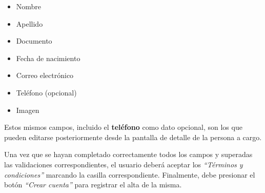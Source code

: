 \documentclass[a4paper,12pt]{article}
\begin{document}
    \begin{itemize}
        \item Nombre
        \item Apellido
        \item Documento
        \item Fecha de nacimiento
        \item Correo electrónico
        \item Teléfono (opcional)
        \item Imagen
    \end{itemize}
    \par Estos mismos campos, incluido el \textbf{teléfono} como dato opcional, son los que pueden editarse posteriormente desde la pantalla de detalle de la persona a cargo.
    \par Una vez que se hayan completado correctamente todos los campos y superadas las validaciones correspondientes, el usuario deberá aceptar los \textit{“Términos y condiciones”} marcando la casilla correspondiente. Finalmente, debe presionar el botón \textit{“Crear cuenta”} para registrar el alta de la misma.
\end{document}
